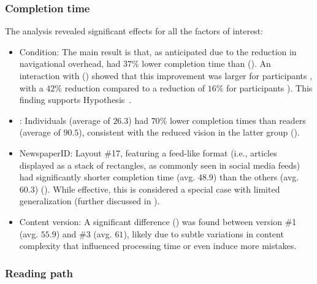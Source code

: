 \subsubsection{Completion time}
The analysis revealed significant effects for all the factors of interest:
\begin{itemize}
    \item {Condition:} The main result is that, as anticipated due to the reduction in navigational overhead, \condtwonot had $37\%$ lower completion time than \condonenot {} (). An interaction with \CVAS () showed that this improvement was larger for  participants \LV, with a $42\%$ reduction  compared to a reduction of $16\%$ for participants \NV {}). This finding supports Hypothesis~\hypperformance.

    \item {\CVAS}: Individuals \NV (average of $26.3$\seconds) had $70\%$ lower completion times than readers \LV (average of $90.5$\seconds), consistent with the reduced vision in the latter group (). 

    \item {NewspaperID:} Layout \#17, featuring a feed-like format (i.e., articles displayed as a stack of rectangles, as commonly seen in social media feeds) had significantly shorter completion time (avg. $48.9$\seconds) than the others (avg. $60.3$\seconds) (). While effective, this is considered a special case with limited generalization (further discussed in ).

    \item {Content version:} A significant difference () was found between version \#1 (avg. $55.9$\seconds) and \#3 (avg. $61$\seconds), likely due to subtle variations in content complexity that influenced processing time or even induce more mistakes.

\end{itemize}

\subsubsection{Reading path}

